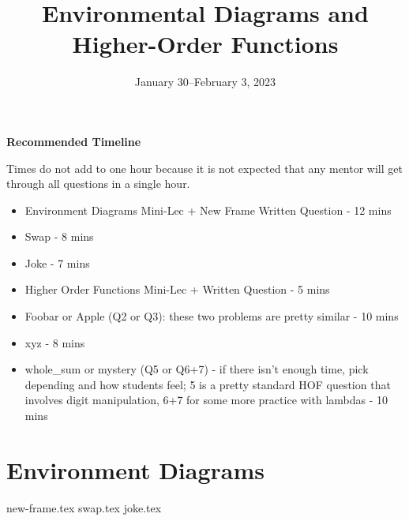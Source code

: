 \documentclass{exam}
\title{Environmental Diagrams \titlebreak and Higher-Order Functions}
\date{January 30--February 3, 2023}
\begin{document}
\maketitle

\begin{blocksection}
\begin{guide}
\textbf{Recommended Timeline}

Times do not add to one hour because it is not expected that any mentor will get through all questions in a single hour. 

\begin{itemize}
    \item Environment Diagrams Mini-Lec + New Frame Written Question - 12 mins
    \item Swap - 8 mins
    \item Joke - 7 mins
    \item Higher Order Functions Mini-Lec + Written Question - 5 mins
    \item Foobar or Apple (Q2 or Q3): these two problems are pretty similar - 10 mins
    \item xyz - 8 mins
    \item whole\_sum or mystery (Q5 or Q6+7) - if there isn't enough time, pick depending and how students feel;
    5 is a pretty standard HOF question that involves digit manipulation, 6+7 for some more practice with lambdas - 10 mins
\end{itemize}
\end{guide}
\end{blocksection}


\section{Environment Diagrams}

\begin{questions}
{new-frame.tex}
{swap.tex}
{joke.tex}
\end{questions}
\end{document}

